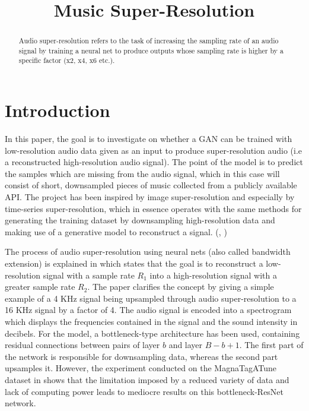 \documentclass[conference]{IEEEtran}
\begin{document}
\title{Music Super-Resolution\\
}

\author{
}

\maketitle

\begin{abstract}
Audio super-resolution refers to the task of increasing the sampling rate of an audio signal by training a neural net to produce outputs whose sampling rate is higher by a specific factor (x2, x4, x6 etc.).
\end{abstract}

\section{Introduction}
	In this paper, the goal is to investigate on whether a GAN can be trained with low-resolution audio data given as an input to produce super-resolution audio (i.e a reconstructed high-resolution audio signal). The point of the model is to predict the samples which are missing from the audio signal, which in this case will consist of short, downsampled pieces of music collected from a publicly available API. The project has been inspired by image super-resolution and especially by time-series super-resolution, which in essence operates with the same methods for generating the training dataset by downsampling high-resolution data and making use of a generative model to reconstruct a signal. (\textcite{kuleshov2017audio}, \textcite{hetherly2017audio})

	The process of audio super-resolution using neural nets (also called bandwidth extension) is explained in \textcite{kuleshov2017audio} which states that the goal is to reconstruct a low-resolution signal with a sample rate $ R_{1} $ into a high-resolution signal with a greater sample rate $ R_{2} $. The paper clarifies the concept by giving a simple example of a 4 KHz signal being upsampled through audio super-resolution to a 16 KHz signal by a factor of 4. The audio signal is encoded into a spectrogram which displays the frequencies contained in the signal and the sound intensity in decibels. For the model, a bottleneck-type architecture has been used, containing residual connections between pairs of layer $ b $ and layer $ B - b + 1 $. The first part of the network is responsible for downsampling data, whereas the second part upsamples it. However, the experiment conducted on the MagnaTagATune dataset in \textcite{kuleshov2017audio} shows that the limitation imposed by a reduced variety of data and lack of computing power leads to mediocre results on this bottleneck-ResNet network.
	

		
\printbibliography
\vspace{12pt}
\end{document}
